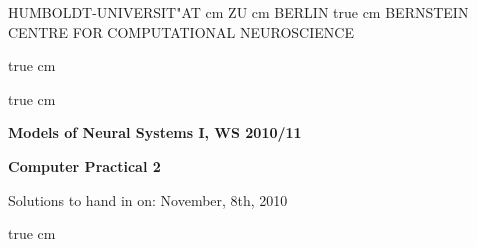\documentclass[12pt, a4]{article}
\begin{document}
\parbox{2cm}{
}
\parbox{11cm}{
\begin{center}
\large HUMBOLDT-UNIVERSIT"AT  cm ZU  cm BERLIN
 true cm
\mgross BERNSTEIN CENTRE FOR COMPUTATIONAL NEUROSCIENCE
\end{center}
}
\parbox{2cm}
{
\hfill
{}
}

 true cm





 true cm
\centerline{\bf Models of Neural Systems I, WS 2010/11}
\centerline{\bf Computer Practical 2}
\centerline{Solutions to hand in on: November, 8th, 2010}


 true cm
\end{document}
